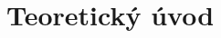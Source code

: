 \documentclass{protokol}
\begin{document}
	\maketitle

	\section{Teoretický úvod}
		
		
		
		
		



	
\end{document}
